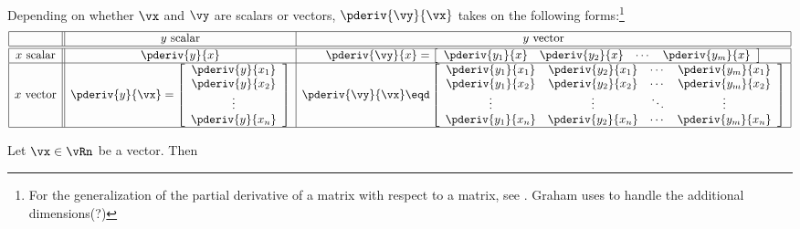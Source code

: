 \begin{remark}
Depending on whether $\vx$ and $\vy$ are scalars or vectors, 
$\pderiv{\vy}{\vx}$ takes on the following 
forms:\footnote{%
  For the generalization of the partial derivative of a matrix
  with respect to a matrix, see
  .
  Graham uses  to handle the additional dimensions(?)
  }
\[
\begin{array}{|c||c|c|}
   \hline
         & \text{$y$ scalar} & \text{$y$ vector} 
   \\
   \hline
   \hline
   \text{$x$ scalar}
   &
   \pderiv{y}{x}
   &
   \pderiv{\vy}{x} = 
   \left[\begin{array}{*{4}{c}}
         \pderiv{y_1}{x} & \pderiv{y_2}{x} & \cdots & \pderiv{y_m}{x} 
      \end{array}\right]
   \\ \hline
   \text{$x$ vector}
   &
   \pderiv{y}{\vx }= 
   \left[\begin{array}{c}
         \pderiv{y}{x_1} \\
         \pderiv{y}{x_2} \\
         \vdots          \\
         \pderiv{y}{x_n}
      \end{array}\right]
   &
   \pderiv{\vy}{\vx} \eqd
   \left[\begin{array}{ccccc}
         \pderiv{y_1}{x_1} & \pderiv{y_2}{x_1} & \cdots & \pderiv{y_m}{x_1} \\
         \pderiv{y_1}{x_2} & \pderiv{y_2}{x_2} & \cdots & \pderiv{y_m}{x_2} \\
         \vdots            & \vdots            & \ddots & \vdots            \\
         \pderiv{y_1}{x_n} & \pderiv{y_2}{x_n} & \cdots & \pderiv{y_m}{x_n}
      \end{array}\right]
   \\
   \hline
  \end{array}
\]
\end{remark}


\begin{lemma}
\label{lem:mc_pxx}
Let $\vx\in\vRn$ be a vector. Then
\end{lemma}


